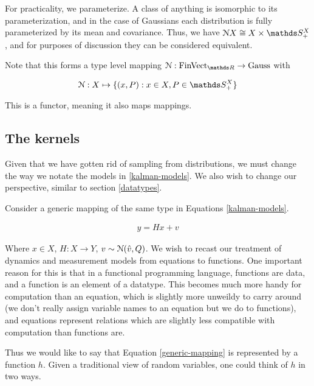 For practicality, we parameterize. A class of anything is isomorphic to its parameterization, and in the case of Gaussians each distribution is fully parameterized by its mean and covariance. Thus, we have $\gaussian X \cong X\times \symmetric^X_+$, and for purposes of discussion they can be considered equivalent.

Note that this forms a type level mapping $\gaussian : \FinVect \rightarrow \gausscat$ with

\begin{equation}
    \gaussian : X \mapsto \{(x,P) : x\in X, P \in \symmetric^X_+\}
\end{equation}

This is a functor, meaning it also maps mappings.

\subsection{The kernels}

Given that we have gotten rid of sampling from distributions, we must change the way we notate the models in \ref{kalman-models}. We also wish to change our perspective, similar to section \ref{datatypes}.

Consider a generic mapping of the same type in Equations \ref{kalman-models}.

\begin{gather}
	\label{generic-mapping}
	y = Hx + v
\end{gather}

Where $x\in X$, $H:X\rightarrow Y$, $v\sim \mathcal{N}(\hat{v}, Q)$.
We wish to recast our treatment of dynamics and measurement models from equations to functions. One important reason for this is that in a functional programming language, functions are data, and a function is an element of a datatype. This becomes much more handy for computation than an equation, which is slightly more unweildy to carry around (we don't really assign variable names to an equation but we do to functions), and equations represent relations which are slightly less compatible with computation than functions are.

Thus we would like to say that Equation \ref{generic-mapping} is represented by a function $h$.
Given a traditional view of random variables, one could think of $h$ in two ways.

